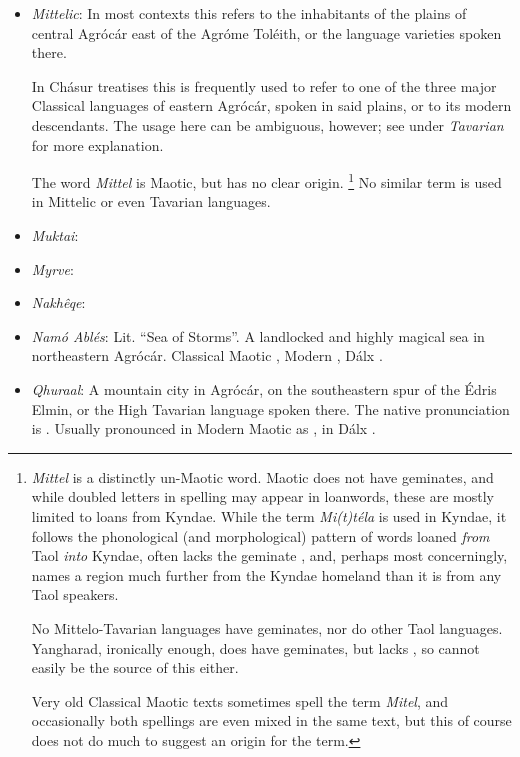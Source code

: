 \documentclass{article}
\let\oldthefootnote\thefootnote
\newcommand\oocfootnote[2][DarkGreen]{\renewcommand\thefootnote{\color{#1}\oldthefootnote}%
  \footnote{\color{#1}#2}%
  \renewcommand{\thefootnote}{\oldthefootnote}}
\begin{document}
\begin{itemize}
 \item \textit{Mittelic}: In most contexts this refers to the inhabitants of the plains of central Agrócár east of the Agróme Toléith, or the language varieties spoken there.

 In Chásur treatises this is frequently used to refer to one of the three major Classical languages of eastern Agrócár, spoken in said plains, or to its modern descendants. The usage here can be ambiguous, however; see under \textit{Tavarian} for more explanation.

 The word \textit{Mittel} is Maotic, but has no clear origin.\oocfootnote{\textit{Mittel} is a distinctly un-Maotic word. Maotic does not have geminates, and while doubled letters in spelling may appear in loanwords, these are mostly limited to loans from Kyndae. While the term \textit{Mi(t)téla} is used in Kyndae, it follows the phonological (and morphological) pattern of words loaned \emph{from} Taol \emph{into} Kyndae, often lacks the geminate \textipa{/t/}, and, perhaps most concerningly, names a region much further from the Kyndae homeland than it is from any Taol speakers. \par No Mittelo-Tavarian languages have geminates, nor do other Taol languages. Yangharad, ironically enough, does have geminates, but lacks \textipa{/m/}, so cannot easily be the source of this either. \par Very old Classical Maotic texts sometimes spell the term \textit{Mitel}, and occasionally both spellings are even mixed in the same text, but this of course does not do much to suggest an origin for the term.} No similar term is used in Mittelic or even Tavarian languages.

 \item \textit{Muktai}:

 \item \textit{Myrve}:

 \item \textit{Nakhêqe}:

 \item \textit{Namó Ablés}: Lit. ``Sea of Storms''. A landlocked and highly magical sea in northeastern Agrócár. Classical Maotic , Modern , Dálx .

 \item \textit{Qhuraal}: A mountain city in Agrócár, on the southeastern spur of the Édris Elmin, or the High Tavarian language spoken there. The native pronunciation is . Usually pronounced in Modern Maotic as , in Dálx .


\end{itemize}
\end{document}
